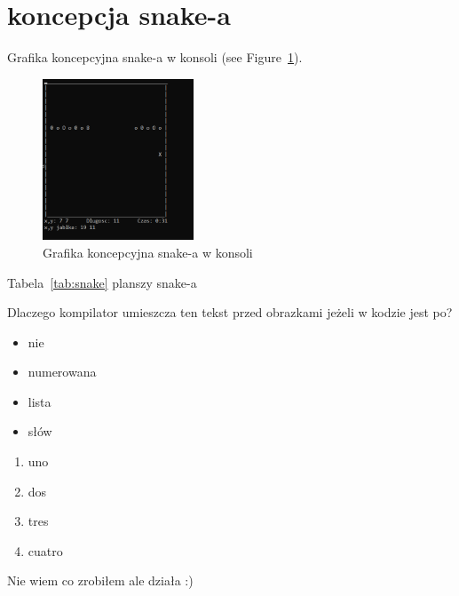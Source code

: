 \pagebreak
\section{koncepcja snake-a} %
\label{sec:Grzyb}

Grafika koncepcyjna snake-a w konsoli (see Figure~\ref{fig:snake}).

\begin{figure}[hthp] %
    \centering
    \includegraphics[width=0.4\textwidth]{pictures/snake.png} %
    \caption{Grafika koncepcyjna snake-a w konsoli}
    \label{fig:snake}
\end{figure}

Tabela~\ref{tab:snake} planszy snake-a %



Dlaczego kompilator umieszcza ten tekst przed obrazkami jeżeli w kodzie jest po?

\begin{itemize}
  \item nie
  \item numerowana
  \item lista 
  \item słów
\end{itemize}
\pagebreak

\begin{enumerate}
    \item uno
    \item dos
    \item tres
    \item cuatro
\end{enumerate}

\vspace{4pt}

Nie wiem co zrobiłem ale działa :)
\vspace{6pt}

